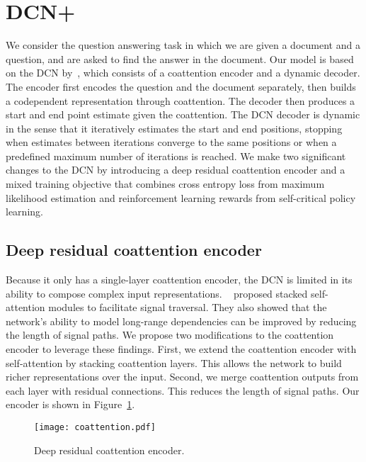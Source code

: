 \documentclass{article} \usepackage{iclr2018_conference,times}
\newcommand{\modelname}{DCN+\xspace}
\begin{document}
\section{\modelname}
We consider the question answering task in which we are given a document and a question, and are asked to find the answer in the document.
Our model is based on the DCN by~\citet{xiong2016dynamic},
which consists of a coattention encoder and a dynamic decoder.
The encoder first encodes the question and the document separately, then builds a codependent representation through coattention.
The decoder then produces a start and end point estimate given the coattention.
The DCN decoder is dynamic in the sense that it iteratively estimates the start and end positions, stopping when estimates between iterations converge to the same positions or when a predefined maximum number of iterations is reached.
We make two significant changes to the DCN by introducing a deep residual coattention encoder and a mixed training objective that combines cross entropy loss from maximum likelihood estimation and reinforcement learning rewards from self-critical policy learning.



\subsection{Deep residual coattention encoder}

Because it only has a single-layer coattention encoder, the DCN is limited in its ability to compose complex input representations.
~\citet{Vaswani2017AttentionIA} proposed stacked self-attention modules to facilitate signal traversal.
They also showed that the network's ability to model long-range dependencies can be improved by reducing the length of signal paths.
We propose two modifications to the coattention encoder to leverage these findings.
First, we extend the coattention encoder with self-attention by stacking coattention layers.
This allows the network to build richer representations over the input.
Second, we merge coattention outputs from each layer with residual connections.
This reduces the length of signal paths.
Our encoder is shown in Figure~\ref{fig:coattention}.

\begin{figure}[t!] 
\begin{center}
	\texttt{[image: coattention.pdf]}
  \end{center}
  \vspace{-2mm}
  \caption{
  Deep residual coattention encoder.
}\label{fig:coattention}
  \vspace{-2mm}
\end{figure}
\end{document}
